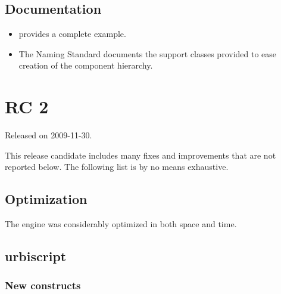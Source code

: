 \subsection{Documentation}

\begin{itemize}
\item {} provides a complete example.
\item The Naming Standard documents the support classes provided to ease
  creation of the component hierarchy.
\end{itemize}

\section{ RC 2}
Released on 2009-11-30.

This release candidate includes many fixes and improvements that are
not reported below. The following list is by no means exhaustive.

\subsection{Optimization}

The \us engine was considerably optimized in both space and
time.

\subsection{urbiscript}

\subsubsection{New constructs}


